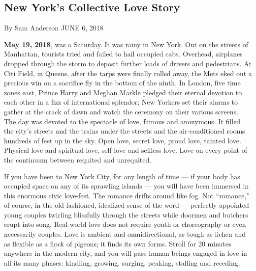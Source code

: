 \hypertarget{new-yorks-collective-love-story-1}{%
\subsection{New York's Collective Love
Story}\label{new-yorks-collective-love-story-1}}

 By Sam Anderson JUNE 6, 2018

\textbf{May 19, 2018}, was a Saturday. It was rainy in New York. Out on
the streets of Manhattan, tourists tried and failed to hail occupied
cabs. Overhead, airplanes dropped through the storm to deposit further
loads of drivers and pedestrians. At Citi Field, in Queens, after the
tarps were finally rolled away, the Mets eked out a precious win on a
sacrifice fly in the bottom of the ninth. In London, five time zones
east, Prince Harry and Meghan Markle pledged their eternal devotion to
each other in a fizz of international splendor; New Yorkers set their
alarms to gather at the crack of dawn and watch the ceremony on their
various screens. The day was devoted to the spectacle of love, famous
and anonymous. It filled the city's streets and the trains under the
streets and the air-conditioned rooms hundreds of feet up in the sky.
Open love, secret love, proud love, tainted love. Physical love and
spiritual love, self-love and selfless love. Love on every point of the
continuum between requited and unrequited.

If you have been to New York City, for any length of time --- if your
body has occupied space on any of its sprawling islands --- you will
have been immersed in this enormous civic love-fest. The romance drifts
around like fog. Not ``romance,'' of course, in the old-fashioned,
idealized sense of the word --- perfectly appointed young couples
twirling blissfully through the streets while doormen and butchers erupt
into song. Real-world love does not require youth or choreography or
even necessarily couples. Love is ambient and omnidirectional, as tough
as lichen and as flexible as a flock of pigeons; it finds its own forms.
Stroll for 20 minutes anywhere in the modern city, and you will pass
human beings engaged in love in all its many phases: kindling, growing,
surging, peaking, stalling and receding.

